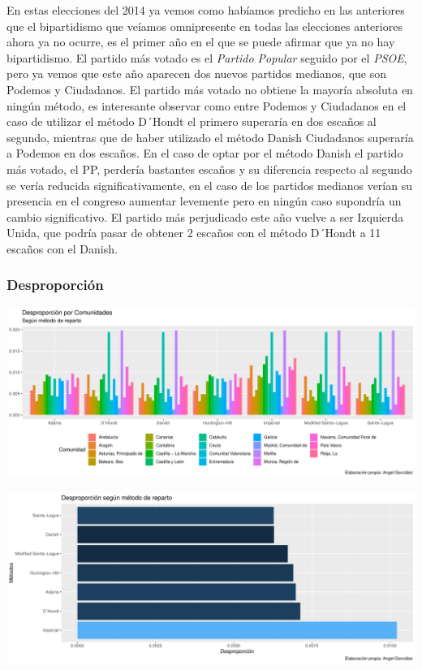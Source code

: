 \documentclass[12pt,a4paper,]{book}
\numberwithin{dummy}{section}
\theoremstyle{ocrenumbox}
\theoremstyle{blacknumex}
\theoremstyle{blacknumbox}
\theoremstyle{ocrenum}
\theoremstyle{ocrenum}
\begin{document}
En estas elecciones del 2014 ya vemos como habíamos predicho en las
anteriores que el bipartidismo que veíamos omnipresente en todas las
elecciones anteriores ahora ya no ocurre, es el primer año en el que se
puede afirmar que ya no hay bipartidismo. El partido más votado es el
\emph{Partido Popular} seguido por el \emph{PSOE}, pero ya vemos que
este año aparecen dos nuevos partidos medianos, que son Podemos y
Ciudadanos. El partido más votado no obtiene la mayoría absoluta en
ningún método, es interesante observar como entre Podemos y Ciudadanos
en el caso de utilizar el método D´Hondt el primero superaría en dos
escaños al segundo, mientras que de haber utilizado el método Danish
Ciudadanos superaría a Podemos en dos escaños. En el caso de optar por
el método Danish el partido más votado, el PP, perdería bastantes
escaños y su diferencia respecto al segundo se vería reducida
significativamente, en el caso de los partidos medianos verían su
presencia en el congreso aumentar levemente pero en ningún caso
supondría un cambio significativo. El partido más perjudicado este año
vuelve a ser Izquierda Unida, que podría pasar de obtener 2 escaños con
el método D´Hondt a 11 escaños con el Danish.

\hypertarget{desproporciuxf3n-11}{%
\subsubsection{Desproporción}\label{desproporciuxf3n-11}}

\begin{center}\includegraphics[width=0.95\linewidth]{figurasR/unnamed-chunk-162-1} \end{center}

\begin{center}\includegraphics[width=0.95\linewidth]{figurasR/unnamed-chunk-162-2} \end{center}
\end{document}

